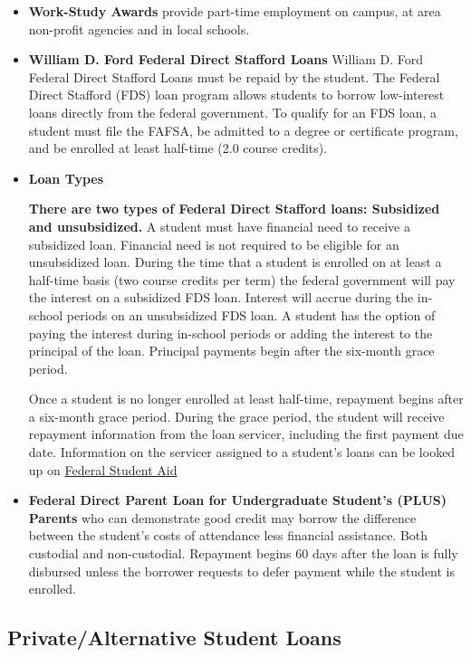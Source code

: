 \documentclass[
  letterpaper,
]{scrbook}
\begin{document}
\begin{itemize}
\item
  \textbf{Work-Study Awards} provide part-time employment on campus, at
  area non-profit agencies and in local schools.
\item
  \textbf{William D. Ford Federal Direct Stafford Loans} William D. Ford
  Federal Direct Stafford Loans must be repaid by the student. The
  Federal Direct Stafford (FDS) loan program allows students to borrow
  low-interest loans directly from the federal government. To qualify
  for an FDS loan, a student must file the FAFSA, be admitted to a
  degree or certificate program, and be enrolled at least half-time (2.0
  course credits).
\item
  \textbf{Loan Types}

  \textbf{There are two types of Federal Direct Stafford loans:
  Subsidized and unsubsidized.} A student must have financial need to
  receive a subsidized loan. Financial need is not required to be
  eligible for an unsubsidized loan. During the time that a student is
  enrolled on at least a half-time basis (two course credits per term)
  the federal government will pay the interest on a subsidized FDS loan.
  Interest will accrue during the in-school periods on an unsubsidized
  FDS loan. A student has the option of paying the interest during
  in-school periods or adding the interest to the principal of the loan.
  Principal payments begin after the six-month grace period.

  Once a student is no longer enrolled at least half-time, repayment
  begins after a six-month grace period. During the grace period, the
  student will receive repayment information from the loan servicer,
  including the first payment due date. Information on the servicer
  assigned to a student's loans can be looked up on
  \href{studentaid.gov.}{Federal Student Aid}
\item
  \textbf{Federal Direct Parent Loan for Undergraduate Student's (PLUS)}
  \textbf{Parents} who can demonstrate good credit may borrow the
  difference between the student's costs of attendance less financial
  assistance. Both custodial and non-custodial. Repayment begins 60 days
  after the loan is fully disbursed unless the borrower requests to
  defer payment while the student is enrolled.
\end{itemize}

\subsection{Private/Alternative Student
Loans}\label{sec-financial-aid-satisfactory-academic-progress-policy}
\end{document}
